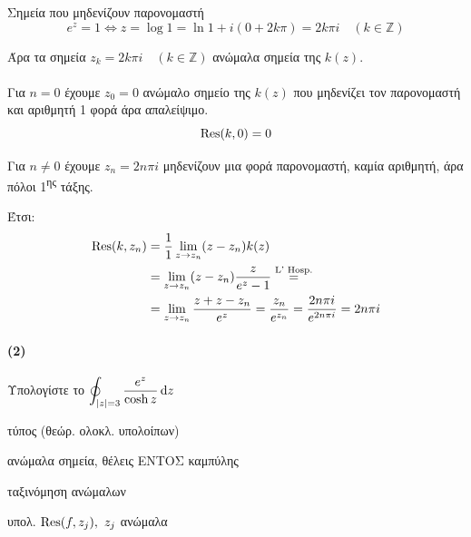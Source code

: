 \documentclass[12pt,a4paper,notitlepage,fleqn]{article}
\begin{document}
\begin{enumlatin}
    	Σημεία που μηδενίζουν παρονομαστή
    	\[
    	e^z = 1 \iff z = \log 1 = \ln 1 + i(0+2k\pi) = 2k\pi i\quad
    	(k \in \mathbb Z)
    	\]

    	Άρα τα σημεία \( z_k = 2k\pi i \quad (k \in \mathbb Z) \) ανώμαλα σημεία
    	της \( k(z) \).

    	\paragraph{}
    	Για \( n = 0 \) έχουμε \( z_0 = 0 \) ανώμαλο σημείο της \( k(z) \) που
    	μηδενίζει τον παρονομαστή και αριθμητή 1 φορά άρα απαλείψιμο.
    	\[
    	\operatorname{Res}(k,0) = 0
    	\]

    	Για \underline{\( n \neq 0 \)} έχουμε \( z_n = 2n\pi i \) μηδενίζουν μια
    	φορά παρονομαστή, καμία αριθμητή, άρα πόλοι 1\textsuperscript{ης} τάξης.

    	Έτσι:
    	\begin{align*}
    		\operatorname{Res}(k,z_n) &= \frac{1}{1} \lim_{z\to z_n} (z-z_n)k(z)
    		\\ &= \lim_{z\to z_n} (z-z_n)\frac{z}{e^z-1} \overset{\text{L' Hosp.}}{=}
    		\\ &= \lim_{z\to z_n} \frac{z+z-z_n}{e^z} = \frac{z_n}{e^{z_n}}
    		= \frac{2n \pi i}{e^{2n\pi i}} = 2n\pi i
    	\end{align*}
    \end{enumlatin}


    \paragraph{(2)}
    Υπολογίστε το \( \displaystyle \oint_{|z| = 3} \frac{e^z}{\cosh z} \mathop{}\!\mathrm{d} z \)

    	\begin{infobox}{}
    		\begin{enumgreekparen}
    			\item τύπος (θεώρ. ολοκλ. υπολοίπων)
    			\item ανώμαλα σημεία, θέλεις ΕΝΤΟΣ καμπύλης
    			\item ταξινόμηση ανώμαλων
    			\item υπολ. \( \operatorname{Res}(f,z_j),\ z_j \) ανώμαλα
    		\end{enumgreekparen}
    	\end{infobox}
\end{document}
